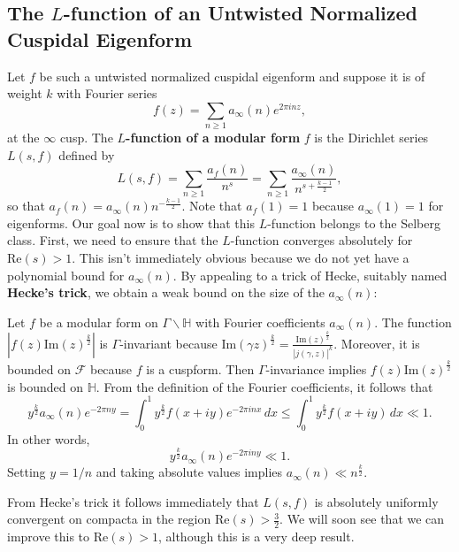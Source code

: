 \documentclass[12pt]{book}
\theoremstyle{definition}\newframedtheorem{method}{Method}
\newcommand{\mc}{\mathcal}
\renewcommand{\H}{\mathbb{H}}
\newcommand{\g}{\gamma}
\newcommand{\G}{\Gamma}
\newcommand{\<}{\langle}
\renewcommand{\>}{\rangle}
\renewcommand{\Re}{\mathrm{Re}}
\renewcommand{\Im}{\mathrm{Im}}
\newcommand{\GH}{\G\backslash\H}
\begin{document}
    \subsection*{The \texorpdfstring{$L$}{L}-function of an Untwisted Normalized Cuspidal Eigenform}
      Let $f$ be such a untwisted normalized cuspidal eigenform and suppose it is of weight $k$ with Fourier series
      \[
        f(z) = \sum_{n \ge 1}a_{\infty}(n)e^{2\pi inz},
      \]
      at the $\infty$ cusp. The \textbf{$L$-function of a modular form} $f$ is the Dirichlet series $L(s,f)$ defined by
      \[
        L(s,f) = \sum_{n \ge 1}\frac{a_{f}(n)}{n^{s}} = \sum_{n \ge 1}\frac{a_{\infty}(n)}{n^{s+\frac{k-1}{2}}},
      \]
      so that $a_{f}(n) = a_{\infty}(n)n^{-\frac{k-1}{2}}$. Note that $a_{f}(1) = 1$ because $a_{\infty}(1) = 1$ for eigenforms. Our goal now is to show that this $L$-function belongs to the Selberg class. First, we need to ensure that the $L$-function converges absolutely for $\Re(s) > 1$. This isn't immediately obvious because we do not yet have a polynomial bound for $a_{\infty}(n)$. By appealing to a trick of Hecke, suitably named \textbf{Hecke's trick}, we obtain a weak bound on the size of the $a_{\infty}(n)$:

      \begin{method}
        Let $f$ be a modular form on $\GH$ with Fourier coefficients $a_{\infty}(n)$. The function $|f(z)\Im(z)^{\frac{k}{2}}|$ is $\G$-invariant because $\Im(\g z)^{\frac{k}{2}} = \frac{\Im(z)^{\frac{k}{2}}}{|j(\g,z)|^{k}}$. Moreover, it is bounded on $\mc{F}$ because $f$ is a cuspform. Then $\G$-invariance implies $f(z)\Im(z)^{\frac{k}{2}}$ is bounded on $\H$. From the definition of the Fourier coefficients, it follows that
        \[
          y^{\frac{k}{2}}a_{\infty}(n)e^{-2\pi ny} = \int_{0}^{1}y^{\frac{k}{2}}f(x+iy)e^{-2\pi inx}\,dx \le \int_{0}^{1}y^{\frac{k}{2}}f(x+iy)\,dx \ll 1.
        \]
        In other words,
        \[
          y^{\frac{k}{2}}a_{\infty}(n)e^{-2\pi iny} \ll 1.
        \]
        Setting $y = 1/n$ and taking absolute values implies $a_{\infty}(n) \ll n^{\frac{k}{2}}$.
      \end{method}

      From Hecke's trick it follows immediately that $L(s,f)$ is absolutely uniformly convergent on compacta in the region $\Re(s) > \frac{3}{2}$. We will soon see that we can improve this to $\Re(s) > 1$, although this is a very deep result.
\end{document}
